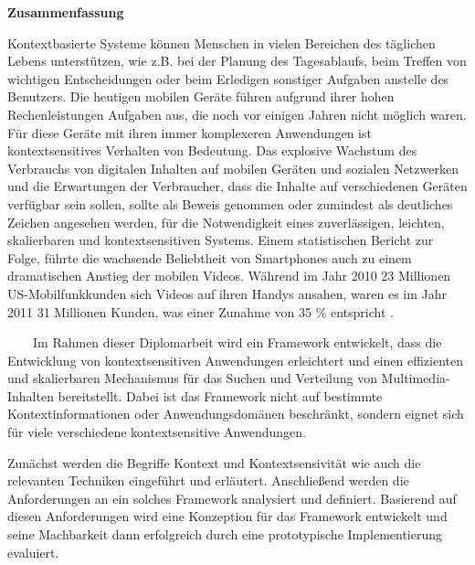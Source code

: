 \thispagestyle{empty}
\vspace*{0.2cm}

\begin{center}
    \textbf{Zusammenfassung}
\end{center}

\vspace*{0.2cm}

\noindent 
Kontextbasierte Systeme k\"onnen Menschen in vielen Bereichen des t\"aglichen Lebens unterst\"utzen, wie z.B. bei der Planung des Tagesablaufs, beim Treffen von wichtigen Entscheidungen oder beim Erledigen sonstiger Aufgaben anstelle des Benutzers. Die heutigen mobilen Ger\"ate f\"uhren aufgrund ihrer hohen Rechenleistungen Aufgaben aus, die noch vor einigen Jahren nicht m\"oglich waren. F\"ur diese Ger\"ate mit ihren immer komplexeren Anwendungen ist kontextsensitives Verhalten von Bedeutung. Das explosive Wachstum des Verbrauchs von digitalen Inhalten auf mobilen Geräten und sozialen Netzwerken und die Erwartungen der Verbraucher, dass die Inhalte auf verschiedenen Ger\"aten verf\"ugbar sein sollen, sollte als Beweis genommen oder zumindest als deutliches Zeichen angesehen werden, für die Notwendigkeit eines zuverl\"assigen, leichten, skalierbaren und kontextsensitiven Systems. Einem statistischen Bericht zur Folge, führte die wachsende Beliebtheit von Smartphones auch zu einem dramatischen Anstieg der mobilen Videos. W\"ahrend im Jahr 2010 23 Millionen US-Mobilfunkkunden sich Videos auf ihren Handys ansahen, waren es im Jahr 2011 31 Millionen Kunden, was einer Zunahme von 35 \% entspricht \cite{mobile-media-report}.

\ \
\ \
Im Rahmen dieser Diplomarbeit wird ein Framework entwickelt, dass die Entwicklung von kontextsensitiven Anwendungen erleichtert und einen effizienten und skalierbaren Mechanismus für das Suchen und Verteilung von Multimedia-Inhalten bereitstellt. Dabei ist das Framework nicht auf bestimmte Kontextinformationen oder Anwendungsdom\"anen beschr\"ankt, sondern eignet sich für viele verschiedene kontextsensitive Anwendungen.

Zun\"achst werden die Begriffe Kontext und Kontextsensivit\"at wie auch die relevanten Techniken eingef\"uhrt und erl\"autert. Anschlie{\ss}end werden die Anforderungen an ein solches Framework analysiert und definiert. Basierend auf diesen Anforderungen wird eine Konzeption für das Framework entwickelt und seine Machbarkeit dann erfolgreich durch eine prototypische Implementierung evaluiert.


